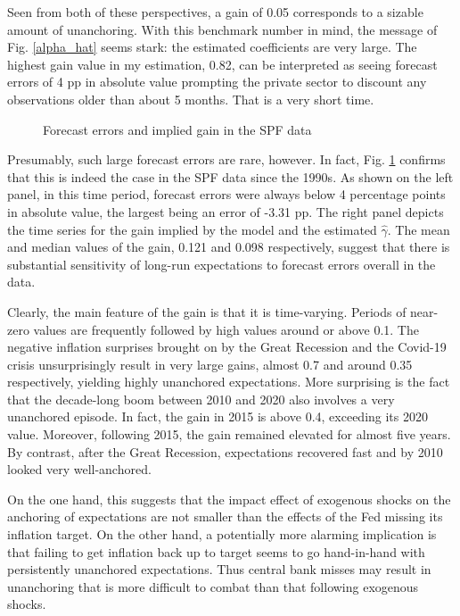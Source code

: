 \documentclass[11pt]{article}
\def \myFigPath {../../figures/}
\renewcommand{\[}{\begin{equation}}
\renewcommand{\]}{\end{equation}}
\def\fignameFeSPF{fe_SPF_command_anchoring_in_data_19_Sep_2020_11_45_59}
\def\fignameGainSPF{gain_SPF_command_anchoring_in_data_11_Oct_2020_11_08_39}
\begin{document}
Seen from both of these perspectives, a gain of 0.05 corresponds to a sizable amount of unanchoring. With this benchmark number in mind, the message of Fig. \ref{alpha_hat} seems stark: the estimated coefficients are very large. The highest gain value in my estimation, 0.82, can be interpreted as seeing forecast errors of 4 pp in absolute value prompting the private sector to discount any observations older than about 5 months. That is a very short time. 

\begin{figure}[h!]
\caption{Forecast errors and implied gain in the SPF data}
\label{feSPF}
\end{figure}

Presumably, such large forecast errors are rare, however. In fact, Fig. \ref{feSPF} confirms that this is indeed the case in the SPF data since the 1990s. As shown on the left panel, in this time period, forecast errors were always below 4 percentage points in absolute value, the largest being an error of -3.31 pp. The right panel depicts the time series for the gain implied by the model and the estimated $\hat{\gamma}$. The mean and median values of the gain, 0.121 and 0.098 respectively, suggest that there is substantial sensitivity of long-run expectations to forecast errors overall in the data.

Clearly, the main feature of the gain is that it is time-varying. Periods of near-zero values are frequently followed by high values around or above 0.1. The negative inflation surprises brought on by the Great Recession and the Covid-19 crisis unsurprisingly result in very large gains, almost 0.7 and around 0.35 respectively, yielding highly unanchored expectations. More surprising is the fact that the decade-long boom between 2010 and 2020 also involves a very unanchored episode. In fact, the gain in 2015 is above 0.4, exceeding its 2020 value. Moreover, following 2015, the gain remained elevated for almost five years. By contrast, after the Great Recession, expectations recovered fast and by 2010 looked very well-anchored. 

On the one hand, this suggests that the impact effect of exogenous shocks on the anchoring of expectations are not smaller than the effects of the Fed missing its inflation target. On the other hand, a potentially more alarming implication is that failing to get inflation back up to target seems to go hand-in-hand with persistently unanchored expectations. Thus central bank misses may result in unanchoring that is more difficult to combat than that following exogenous shocks.
\end{document}
